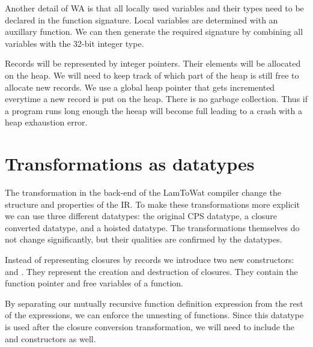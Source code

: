 Another detail of \ac{WA} is that all locally used variables and their types need to be declared in the function signature. Local variables are determined with an auxillary function. We can then generate the required signature by combining all variables with the 32-bit integer type.

Records will be represented by integer pointers. Their elements will be allocated on the heap. We will need to keep track of which part of the heap is still free to allocate new records. We use a global heap pointer that gets incremented everytime a new record is put on the heap. There is no garbage collection. Thus if a program runs long enough the heeap will become full leading to a crash with a heap exhaustion error. 

\section{\label{section:comtree}Transformations as datatypes}
The transformation in the back-end of the LamToWat compiler change the structure and properties of the \ac{IR}. To make these transformations more explicit we can use three different datatypes: the original \ac{CPS} datatype, a closure converted datatype, and a hoisted datatype. The transformations themselves do not change significantly, but their qualities are confirmed by the datatypes.

Instead of representing closures by records we introduce two new constructors:  and . They represent the creation and destruction of closures. They contain the function pointer and free variables of a function.

By separating our mutually recursive function definition expression from the rest of the expressions, we can enforce the unnesting of functions. Since this datatype is used after the closure conversion transformation, we will need to include the  and  constructors as well.

